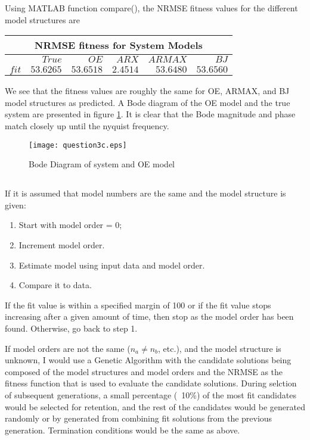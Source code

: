 \documentclass[times,12pt,reqno]{amsart}
\begin{document}
Using MATLAB function compare(), the NRMSE fitness values for the different
model structures are
\begin{center}
    \begin{tabular} {|r|r|r|r|r|r|}
        \hline
        \multicolumn{6}{|c|}{NRMSE fitness for System Models} \\
        \hline
        \nonumber & ${True}$ & ${OE}$ & ${ARX}$ & ${ARMAX}$ & ${BJ}$ \\
        \hline
        $fit$ & $53.6265$ & $53.6518$ & $2.4514$ & $53.6480$ & $53.6560$ \\
        \hline
    \end{tabular}
\end{center}

We see that the fitness values are roughly the same for OE, ARMAX, and BJ model
structures as predicted. A Bode diagram of the OE model and the true system are
presented in figure \ref{fig:q3c}. It is clear that the Bode magnitude and
phase match closely up until the nyquist frequency.
\begin{figure}[H]
    \begin{center}
        \texttt{[image: question3c.eps]}
    \end{center}
    \caption{Bode Diagram of system and OE model}
    \label{fig:q3c}
\end{figure}

\subsection{}
If it is assumed that model numbers are the same and the model structure is
given:
\begin{enumerate}
    \item Start with model order = 0;
    \item Increment model order.
    \item Estimate model using input data and model order.
    \item Compare it to data.
\end{enumerate}
If the fit value is within a specified margin of 100 or
if the fit value stops increasing after a given amount of time, then stop as
the model order has been found. Otherwise, go back to step 1.

If model orders are not the same ($ n_a \neq n_b $, etc.), and the model
structure is unknown, I would use a Genetic Algorithm with the candidate
solutions being composed of the model structures and model orders and the NRMSE
as the fitness function that is used to evaluate the candidate solutions.
During selction of subsequent generations, a small percentage (~10\%) of the
most fit candidates would be selected for retention, and the rest of the
candidates would be generated randomly or by generated from combining fit
solutions from the previous generation. Termination conditions would be the
same as above.
\end{document}
